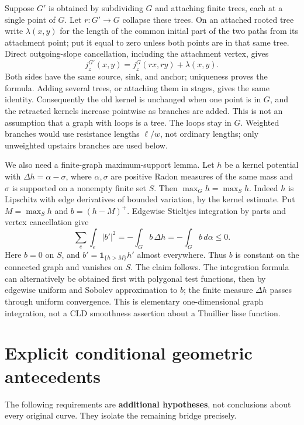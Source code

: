 \documentclass[
  11pt,
]{article}
\begin{document}
Suppose \(G'\) is obtained by subdividing \(G\) and attaching finite
trees, each at a single point of \(G\). Let \(r:G'\to G\) collapse these
trees. On an attached rooted tree write \(\lambda(x,y)\) for the length
of the common initial part of the two paths from its attachment point;
put it equal to zero unless both points are in that same tree. Direct
outgoing-slope cancellation, including the attachment vertex, gives \[
 j^{G'}_z(x,y)=j^G_z(rx,ry)+\lambda(x,y).
\] Both sides have the same source, sink, and anchor; uniqueness proves
the formula. Adding several trees, or attaching them in stages, gives
the same identity. Consequently the old kernel is unchanged when one
point is in \(G\), and the retracted kernels increase pointwise as
branches are added. This is not an assumption that a graph with loops is
a tree. The loops stay in \(G\). Weighted branches would use resistance
lengths \(\ell/w\), not ordinary lengths; only unweighted upstairs
branches are used below.

We also need a finite-graph maximum-support lemma. Let \(h\) be a kernel
potential with \(\Delta h=\alpha-\sigma\), where \(\alpha,\sigma\) are
positive Radon measures of the same mass and \(\sigma\) is supported on
a nonempty finite set \(S\). Then \(\max_Gh=\max_Sh\). Indeed \(h\) is
Lipschitz with edge derivatives of bounded variation, by the kernel
estimate. Put \(M=\max_Sh\) and \(b=(h-M)^+\). Edgewise Stieltjes
integration by parts and vertex cancellation give \[
 \sum_e\int_e|b'|^2=-\int_G b\,\Delta h
       =-\int_Gb\,d\alpha\leq0.
\] Here \(b=0\) on \(S\), and \(b'=\mathbf1_{\{h>M\}}h'\) almost
everywhere. Thus \(b\) is constant on the connected graph and vanishes
on \(S\). The claim follows. The integration formula can alternatively
be obtained first with polygonal test functions, then by edgewise
uniform and Sobolev approximation to \(b\); the finite measure
\(\Delta h\) passes through uniform convergence. This is elementary
one-dimensional graph integration, not a CLD smoothness assertion about
a Thuillier lisse function.

\section{Explicit conditional geometric
antecedents}\label{explicit-conditional-geometric-antecedents}

The following requirements are \textbf{additional hypotheses}, not
conclusions about every original curve. They isolate the remaining
bridge precisely.
\end{document}
